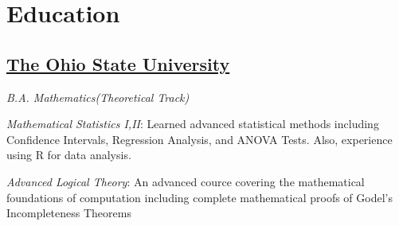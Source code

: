 \documentclass[letterpaper,11pt]{article}
\begin{document}
\section{Education}
\subsection{\href{https://www.osu.edu/}{The Ohio State University}}
\textit{B.A. Mathematics(Theoretical Track)}
\vspace{2mm}
\begin{adjustwidth}{1cm}{1cm}
\textit{Mathematical Statistics I,II}: Learned advanced statistical methods including Confidence Intervals, Regression Analysis, and ANOVA Tests. Also, experience using R for data analysis.

\vspace{2mm}
\textit{Advanced Logical Theory}: An advanced cource covering the mathematical foundations of computation
including complete mathematical proofs of Godel's Incompleteness Theorems
\end{adjustwidth}
\end{document}
